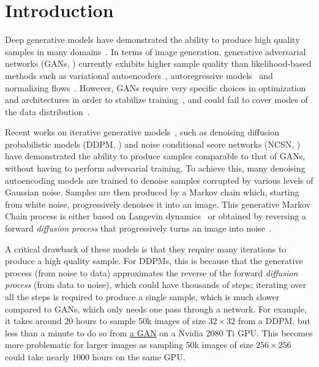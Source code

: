 \section{Introduction}
Deep generative models have demonstrated the ability to produce high quality samples in many domains~\citep{karras2020analyzing,oord2016wavenet}. In terms of image generation, generative adversarial networks (GANs, \citet{goodfellow2014generative}) currently exhibits higher sample quality than likelihood-based methods such as variational autoencoders~\citep{kingma2013auto}, autoregressive models~\citep{oord2016pixel} and normalizing flows~\citep{rezende2015variational,dinh2016density}. However, GANs require very specific choices in optimization and architectures in order to stabilize training~\citep{arjovsky2017wasserstein,gulrajani2017improved,karras2018a,brock2018large}, and could fail to cover modes of the data distribution~\citep{zhao2018bias}.

Recent works on iterative generative models~\citep{bengio2014deep}, such as denoising diffusion probabilistic models (DDPM, \citet{ho2020denoising}) and noise conditional score networks (NCSN, \citet{song2019generative}) %
have demonstrated the ability to produce samples comparable to that of GANs, without having to perform adversarial training. To achieve this, many denoising autoencoding models are trained to denoise samples corrupted by various levels of Gaussian noise. Samples are then produced by a Markov chain which, starting from white noise, progressively denoises it into an image. This generative Markov Chain process is either based on Langevin dynamics~\citep{song2019generative} or obtained by reversing a forward \textit{diffusion process} that progressively turns an image into noise~\citep{sohl-dickstein2015deep}. 

A critical drawback of these models is that they require many iterations to produce a high quality sample. For DDPMs, this is because that the generative process (from noise to data) approximates the reverse of the forward \textit{diffusion process} (from data to noise), which could have thousands of steps; iterating over all the steps is required to produce a single sample, which is much slower compared to GANs, which only needs one pass through a network. 
For example, it takes around 20 hours to sample 50k images of size $32 \times 32$ from a DDPM, but less than a minute to do so from \href{https://github.com/ajbrock/BigGAN-PyTorch}{\underline{a GAN}} on a Nvidia 2080 Ti GPU. This becomes more problematic for larger images as sampling 50k images of size $256 \times 256$ could take nearly $1000$ hours on the same GPU.

